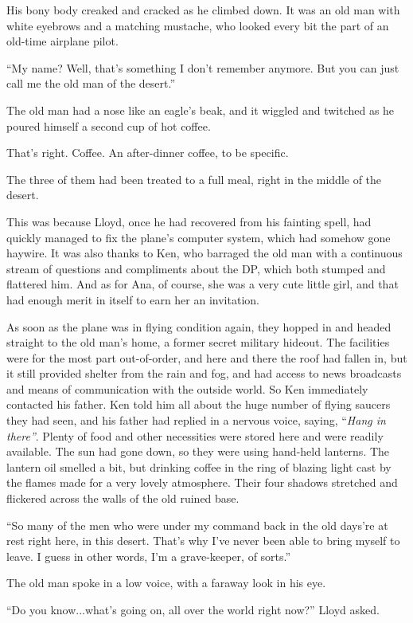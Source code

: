 \documentclass[
]{article}
\begin{document}
His bony body creaked and cracked as he climbed down. It was an old man
with white eyebrows and a matching mustache, who looked every bit the
part of an old-time airplane pilot.

``My name? Well, that's something I don't remember anymore. But you can
just call me the old man of the desert.''

The old man had a nose like an eagle's beak, and it wiggled and twitched
as he poured himself a second cup of hot coffee.

That's right. Coffee. An after-dinner coffee, to be specific.

The three of them had been treated to a full meal, right in the middle
of the desert.

This was because Lloyd, once he had recovered from his fainting spell,
had quickly managed to fix the plane's computer system, which had
somehow gone haywire. It was also thanks to Ken, who barraged the old
man with a continuous stream of questions and compliments about the DP,
which both stumped and flattered him. And as for Ana, of course, she was
a very cute little girl, and that had enough merit in itself to earn her
an invitation.

As soon as the plane was in flying condition again, they hopped in and
headed straight to the old man's home, a former secret military hideout.
The facilities were for the most part out-of-order, and here and there
the roof had fallen in, but it still provided shelter from the rain and
fog, and had access to news broadcasts and means of communication with
the outside world. So Ken immediately contacted his father. Ken told him
all about the huge number of flying saucers they had seen, and his
father had replied in a nervous voice, saying, ``\emph{Hang in there''}.
Plenty of food and other necessities were stored here and were readily
available. The sun had gone down, so they were using hand-held lanterns.
The lantern oil smelled a bit, but drinking coffee in the ring of
blazing light cast by the flames made for a very lovely atmosphere.
Their four shadows stretched and flickered across the walls of the old
ruined base.

``So many of the men who were under my command back in the old days're
at rest right here, in this desert. That's why I've never been able to
bring myself to leave. I guess in other words, I'm a grave-keeper, of
sorts.''

The old man spoke in a low voice, with a faraway look in his eye.

``Do you know...what's going on, all over the world right now?'' Lloyd
asked.
\end{document}
